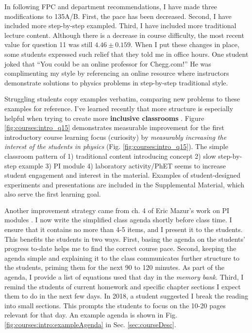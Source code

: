 \documentclass[../../main.tex]{subfiles}
\begin{document}
In following FPC and department recommendations, I have made three modifications to 135A/B.  First, the pace has been decreased.  Second, I have included more step-by-step exampled.  Third, I have included more traditional lecture content.  Although there is a decrease in course difficulty, the most recent value for question 11 was still $4.46 \pm 0.159$.  When I put these changes in place, some students expressed such relief that they told me in office hours.  One student joked that ``You could be an online professor for Chegg.com!'' He was complimenting my style by referencing an online resource where instructors demonstrate solutions to physics problems in step-by-step traditional style.  \\ \hspace{0.1cm}

Struggling students copy examples verbatim, comparing new problems to these examples for reference.  I've learned recently that more structure is especially helpful when trying to create more \textbf{inclusive classrooms} \cite{inclusive}. Figure \ref{fig:courses:intro_q15} demonstrates measurable improvement for the first introductory course learning focus (curiosity) by \textit{measurably increasing the interest of the students in physics} (Fig. \ref{fig:courses:intro_q15}).  The simple classroom pattern of 1) traditional content introducing concept 2) slow step-by-step example 3) PI module 4) laboratory activity/PhET seems to increase student engagement and interest in the material.  Examples of student-designed experiments and presentations are included in the Supplemental Material, which also serve the first learning goal.\\ \hspace{0.1cm}

Another improvement strategy came from ch. 4 of Eric Mazur's work on PI modules \cite{mazur}.  I now write the simplified class agenda shortly before class time.  I ensure that it contains no more than 4-5 items, and I present it to the students.  This benefits the students in two ways.  First, basing the agenda on the students' progress to-date helps me to find the correct course pace.  Second, keeping the agenda simple and explaining it to the class communicates further structure to the students, priming them for the next 90 to 120 minutes.  As part of the agenda, I provide a list of equations used that day in the \textit{memory bank}.  Third, I remind the students of current homework and specific chapter sections I expect them to do in the next few days.  In 2018, a student suggested I break the reading into small sections.  This prompts the students to focus on the 10-20 pages relevant for that day.  An example agenda is shown in Fig. \ref{fig:courses:intro:exampleAgenda} in Sec. \ref{sec:courseDesc}. \\ \hspace{0.1cm}
\end{document}
